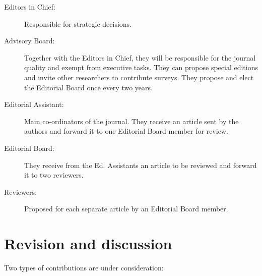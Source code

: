 \documentclass[twoside,a4paper,11pt]{article}
\begin{document}
\begin{description}
\item[Editors in Chief:] Responsible for strategic decisions.

\item[Advisory Board:] Together with the Editors in Chief,
they will be responsible for the journal quality and exempt from
executive tasks. They can propose special editions and invite other
researchers to contribute surveys. They propose and elect the Editorial
Board once every two years.

\item[Editorial Assistant:] Main co-ordinators of the journal. They
receive an article sent by the authors and forward it to one
Editorial Board member for review.

\item[Editorial Board:] They receive from the Ed. Assistants an
article to be reviewed and forward it to two reviewers.

\item[Reviewers:] Proposed for each separate article by an Editorial
Board member.
\end{description}

\section{Revision and discussion}

Two types of contributions are under consideration:
\end{document}
